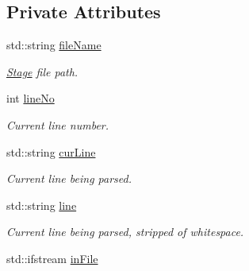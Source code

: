 \subsection*{Private Attributes}
\begin{DoxyCompactItemize}
\item 
std\+::string \hyperlink{class_stage_loader_a3574f9ea01596806f37b196849bbefae}{file\+Name}\hypertarget{class_stage_loader_a3574f9ea01596806f37b196849bbefae}{}\label{class_stage_loader_a3574f9ea01596806f37b196849bbefae}

\begin{DoxyCompactList}\small\item\em \hyperlink{class_stage}{Stage} file path. \end{DoxyCompactList}\item 
int \hyperlink{class_stage_loader_a69303db8d3e7d91e0de14b6f7c2c08ab}{line\+No}\hypertarget{class_stage_loader_a69303db8d3e7d91e0de14b6f7c2c08ab}{}\label{class_stage_loader_a69303db8d3e7d91e0de14b6f7c2c08ab}

\begin{DoxyCompactList}\small\item\em Current line number. \end{DoxyCompactList}\item 
std\+::string \hyperlink{class_stage_loader_a8413ef9f88df043d287d92afe55f9e7a}{cur\+Line}\hypertarget{class_stage_loader_a8413ef9f88df043d287d92afe55f9e7a}{}\label{class_stage_loader_a8413ef9f88df043d287d92afe55f9e7a}

\begin{DoxyCompactList}\small\item\em Current line being parsed. \end{DoxyCompactList}\item 
std\+::string \hyperlink{class_stage_loader_a9387427e7e4ca5a9210bfac081dc048b}{line}\hypertarget{class_stage_loader_a9387427e7e4ca5a9210bfac081dc048b}{}\label{class_stage_loader_a9387427e7e4ca5a9210bfac081dc048b}

\begin{DoxyCompactList}\small\item\em Current line being parsed, stripped of whitespace. \end{DoxyCompactList}\item 
std\+::ifstream \hyperlink{class_stage_loader_a9d71f768884e3dd10f9c773a41af83e0}{in\+File}\hypertarget{class_stage_loader_a9d71f768884e3dd10f9c773a41af83e0}{}\label{class_stage_loader_a9d71f768884e3dd10f9c773a41af83e0}


\end{DoxyCompactItemize}
